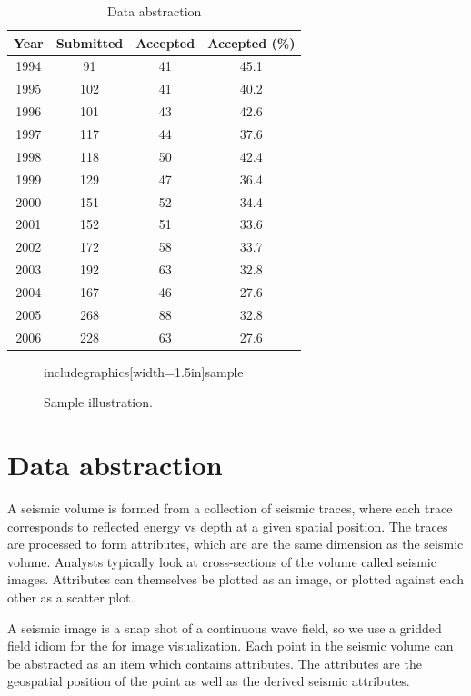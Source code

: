 \documentclass[journal]{vgtc}                %
\begin{document}
\begin{table}
 \caption{Data abstraction}
 \label{data_abstract}
 \scriptsize
 \begin{center}
   \begin{tabular}{cccc}
     Year & Submitted & Accepted & Accepted (\%)\\
   \hline
     1994 &  91 & 41 & 45.1\\
     1995 & 102 & 41 & 40.2\\
     1996 & 101 & 43 & 42.6\\
     1997 & 117 & 44 & 37.6\\
     1998 & 118 & 50 & 42.4\\
     1999 & 129 & 47 & 36.4\\
     2000 & 151 & 52 & 34.4\\
     2001 & 152 & 51 & 33.6\\
     2002 & 172 & 58 & 33.7\\
     2003 & 192 & 63 & 32.8\\
     2004 & 167 & 46 & 27.6\\
     2005 & 268 & 88 & 32.8\\
     2006 & 228 & 63 & 27.6
   \end{tabular}
 \end{center}
\end{table}

\begin{figure}[htb]
\centering
includegraphics[width=1.5in]{sample}
\caption{Sample illustration.}
\end{figure}

\section{Data abstraction}
A seismic volume is formed from a collection of seismic traces, where each trace
corresponds to reflected energy vs depth at a given spatial position. The traces are processed
to form attributes, which are are the same dimension as the seismic volume. Analysts typically
look at cross-sections of the volume called seismic images. Attributes
can themselves be plotted as an image, or plotted against each other as a scatter plot.

A seismic image is a snap shot of a continuous wave field, so we use a gridded field
idiom for the for image visualization. Each point in the seismic volume can be abstracted
as an item which contains attributes. The attributes are the geospatial position of the
point as well as the derived seismic attributes.
\end{document}
